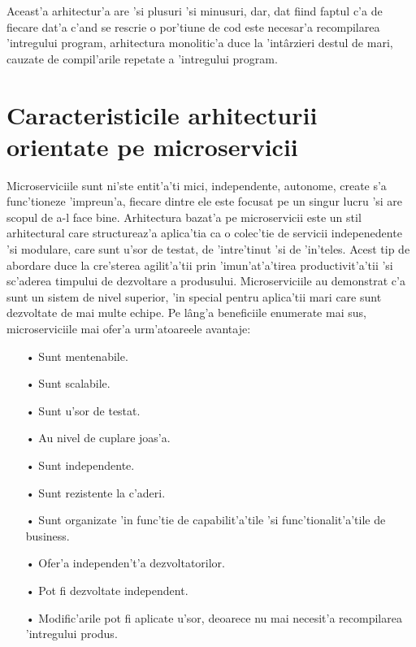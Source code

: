 \documentclass[12pt,a4paper,twoside]{report}
\begin{document}
Aceast'a arhitectur'a are 'si plusuri 'si minusuri, dar, dat fiind faptul c'a de fiecare dat'a c'and se rescrie o por'tiune de cod este necesar'a recompilarea 'intregului program, arhitectura monolitic'a  duce la 'intârzieri destul de mari, cauzate de compil'arile repetate a 'intregului program.

\section{Caracteristicile arhitecturii orientate pe microservicii}
Microserviciile\cite{go_book_microservices} sunt ni'ste entit'a'ti mici, independente, autonome, create s'a func'tioneze 'impreun'a, fiecare dintre ele este focusat pe un singur lucru 'si  are scopul de a-l face bine.
Arhitectura bazat'a pe microservicii este un stil arhitectural care structureaz'a aplica'tia ca o colec'tie de servicii indepenedente 'si modulare, care sunt u'sor de testat, de 'intre'tinut 'si de 'in'teles.
Acest tip de abordare duce la cre'sterea agilit'a'tii prin 'imun'at'a'tirea productivit'a'tii 'si sc'aderea timpului de dezvoltare a produsului.
Microserviciile au demonstrat c'a sunt un sistem de nivel superior, 'in special pentru aplica'tii mari care sunt dezvoltate de mai multe echipe.
 Pe lâng'a beneficiile enumerate mai sus, microserviciile mai ofer'a urm'atoareele avantaje:
\begin{itemize}
\item[•] Sunt mentenabile.
\item[•] Sunt scalabile.
\item[•] Sunt u'sor de testat.
\item[•] Au nivel de cuplare joas'a.
\item[•] Sunt independente. 
\item[•] Sunt rezistente la c'aderi.
\item[•] Sunt organizate 'in func'tie de capabilit'a'tile 'si func'tionalit'a'tile de business.
\item[•] Ofer'a independen't'a dezvoltatorilor.
\item[•] Pot fi dezvoltate independent.
\item[•] Modific'arile pot fi aplicate u'sor, deoarece nu mai necesit'a recompilarea 'intregului produs.
\end{itemize}
\end{document}
